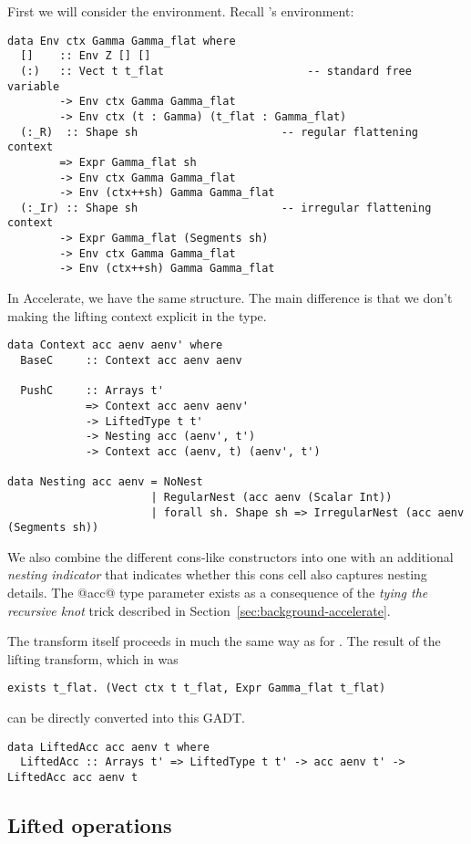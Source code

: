 First we will consider the environment. Recall \ndp{}'s environment:
%
\begin{lstlisting}[style=ndp]
data Env ctx Gamma Gamma_flat where
  []    :: Env Z [] []
  (:)   :: Vect t t_flat                      -- standard free variable
        -> Env ctx Gamma Gamma_flat
        -> Env ctx (t : Gamma) (t_flat : Gamma_flat)
  (:_R)  :: Shape sh                      -- regular flattening context
        => Expr Gamma_flat sh
        -> Env ctx Gamma Gamma_flat
        -> Env (ctx++sh) Gamma Gamma_flat
  (:_Ir) :: Shape sh                      -- irregular flattening context
        -> Expr Gamma_flat (Segments sh)
        -> Env ctx Gamma Gamma_flat
        -> Env (ctx++sh) Gamma Gamma_flat
\end{lstlisting}
%
In Accelerate, we have the same structure. The main difference is that we don't making the lifting context explicit in the type.
%
\begin{lstlisting}
data Context acc aenv aenv' where
  BaseC     :: Context acc aenv aenv

  PushC     :: Arrays t'
            => Context acc aenv aenv'
            -> LiftedType t t'
            -> Nesting acc (aenv', t')
            -> Context acc (aenv, t) (aenv', t')

data Nesting acc aenv = NoNest
                      | RegularNest (acc aenv (Scalar Int))
                      | forall sh. Shape sh => IrregularNest (acc aenv (Segments sh))
\end{lstlisting}
%
We also combine the different cons-like constructors into one with an additional \emph{nesting indicator} that indicates whether this cons cell also captures nesting details. The @acc@ type parameter exists as a consequence of the \emph{tying the recursive knot} trick described in Section~\ref{sec:background-accelerate}.

The transform itself proceeds in much the same way as for \ndp{}. The result of the lifting transform, which in \ndp{} was
%
\begin{lstlisting}[style=ndp]
exists t_flat. (Vect ctx t t_flat, Expr Gamma_flat t_flat)
\end{lstlisting}
%
can be directly converted into this GADT.
%
\begin{lstlisting}
data LiftedAcc acc aenv t where
  LiftedAcc :: Arrays t' => LiftedType t t' -> acc aenv t' -> LiftedAcc acc aenv t
\end{lstlisting}
%

\subsection{Lifted operations}

